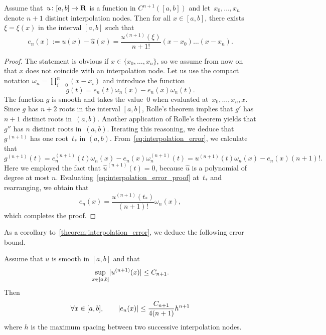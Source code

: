 \begin{theorem}
    \label{theorem:interpolation_error}
    Assume that~$u\colon [a, b] \to \mathbf R$ is a function in $C^{n+1}([a, b])$ and let~$x_0, \dotsc, x_n$ denote $n+1$ distinct interpolation nodes.
    Then for all $x \in [a, b]$,
    there exists~$\xi = \xi(x)$ in the interval $[a, b]$ such that
    \[
        e_n(x) := u(x) - \widehat u(x) = \frac{u^{(n+1)}(\xi)}{n+1!} (x-x_0) \dotsc (x - x_n).
    \]
\end{theorem}
\begin{proof}
    The statement is obvious if $x \in \{x_0, \dotsc, x_n\}$,
    so we assume from now on that $x$ does not coincide with an interpolation node.
    Let us use the compact notation $\omega_n = \prod_{i=0}^n (x - x_i)$ and introduce the function
    \begin{equation}
        \label{eq:interpolation_error}
        g(t) = e_n(t) \omega_n(x) - e_n(x) \omega_n(t).
    \end{equation}
    The function $g$ is smooth and takes the value~0 when evaluated at~$x_0, \dotsc, x_n, x$.
    Since $g$ has $n+2$ roots in the interval $[a, b]$,
    Rolle's theorem implies that $g'$ has $n+1$ distinct roots in~$(a, b)$.
    Another application of Rolle's theorem yields that $g''$ has $n$ distinct roots in~$(a, b)$.
    Iterating this reasoning, we deduce that $g^{(n+1)}$ has one root~$t_*$ in $(a, b)$.
    From~\eqref{eq:interpolation_error},
    we calculate that
    \begin{equation}
        \label{eq:interpolation_error_proof}
        g^{(n+1)}(t) = e_n^{(n+1)}(t) \omega_n(x) - e_n(x) \omega_n^{(n+1)}(t)
        = u^{(n+1)}(t) \omega_n(x) - e_n(x) (n+1)!.
    \end{equation}
    Here we employed the fact that $\widehat u^{(n+1)}(t) = 0$,
    because $\widehat u$ is a polynomial of degree at most $n$.
    Evaluating~\eqref{eq:interpolation_error_proof} at~$t_*$ and rearranging,
    we obtain that
    \[
        e_n(x) = \frac{u^{(n+1)}(t_*)}{(n+1)!} \omega_n(x),
    \]
    which completes the proof.
\end{proof}
As a corollary to~\cref{theorem:interpolation_error},
we deduce the following error bound.
\begin{corollary}
    \label{corollary:interpolation_error}
    Assume that $u$ is smooth in $[a, b]$ and that
    \[
        \sup_{x \in [a, b]} \lvert u^{(n+1)}(x)\rvert \leq C_{n+1}.
    \]
    Then
    \begin{equation}
        \label{eq:upper_bound_interp_error}
        \forall x \in [a, b], \qquad
        \lvert e_n(x)\rvert \leq \frac{C_{n+1}}{4(n+1)} h^{n+1}
    \end{equation}
    where $h$ is the maximum spacing between two successive interpolation nodes.
\end{corollary}
